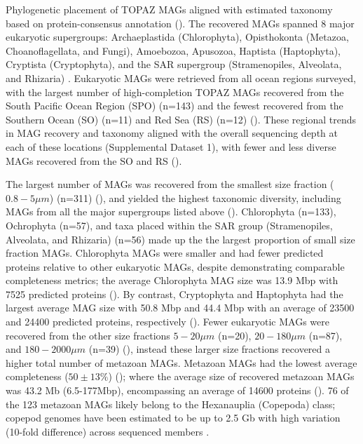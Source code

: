 \documentclass[12pt]{article}
\numberwithin{equation}{section}
\begin{document}
Phylogenetic placement of TOPAZ MAGs aligned with estimated taxonomy based on protein-consensus annotation (). The recovered MAGs spanned 8 major eukaryotic supergroups: Archaeplastida (Chlorophyta), Opisthokonta (Metazoa, Choanoflagellata, and Fungi), Amoebozoa, Apusozoa, Haptista (Haptophyta), Cryptista (Cryptophyta), and the SAR supergroup (Stramenopiles, Alveolata, and Rhizaria) \citep{Burki_2020}. Eukaryotic MAGs were retrieved from all ocean regions surveyed, with the largest number of high-completion TOPAZ MAGs recovered from the South Pacific Ocean Region (SPO) (n=143) and the fewest recovered from the Southern Ocean (SO) (n=11) and Red Sea (RS) (n=12) (). These regional trends in MAG recovery and taxonomy aligned with the overall sequencing depth at each of these locations (Supplemental Dataset 1), with fewer and less diverse MAGs recovered from the SO and RS ().

The largest number of MAGs was recovered from the smallest size fraction ($0.8-5 \mu m$) (n=311) (), and yielded the highest taxonomic diversity, including MAGs from all the major supergroups listed above (). Chlorophyta (n=133), Ochrophyta (n=57), and taxa placed within the SAR group (Stramenopiles, Alveolata, and Rhizaria) (n=56) made up the  the largest proportion of small size fraction MAGs. Chlorophyta MAGs were smaller and had fewer predicted proteins relative to other eukaryotic MAGs, despite demonstrating comparable completeness metrics; the average Chlorophyta MAG size was 13.9 Mbp with 7525 predicted proteins (). By contrast, Cryptophyta and Haptophyta had the largest average MAG size with 50.8 Mbp and 44.4 Mbp with an average of 23500 and 24400 predicted proteins, respectively (). Fewer eukaryotic MAGs were recovered from the other size fractions $5-20\mu m$ (n=20), $20-180 \mu m$ (n=87), and $180-2000\mu m$ (n=39) (), instead these larger size fractions recovered a higher total number of metazoan MAGs. Metazoan MAGs had the lowest average completeness ($50 \pm 13\%$) (); where the average size of recovered metazoan MAGs was 43.2 Mb (6.5-177Mbp), encompassing an average of 14600 proteins (). 76 of the 123 metazoan MAGs likely belong to the  Hexanauplia (Copepoda) class; copepod genomes have been estimated to be up to 2.5 Gb with high variation (10-fold difference) across sequenced members \citep{Jorgensen_2019}. 
\end{document}
